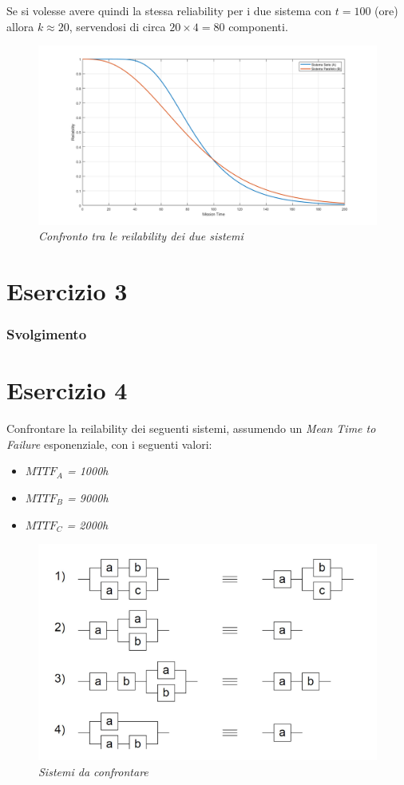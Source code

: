 Se si volesse avere quindi la stessa reliability per i due sistema con $t=100$ (ore) allora $k\approx20$, servendosi di circa $20\times 4 = 80$ componenti.
\begin{figure}[H]
	\centering
	\includegraphics[width=\textwidth]{img/hw5/es2_grafico3.png}
	\caption{\textit{Confronto tra le reilability dei due sistemi}}
\end{figure}

\section{Esercizio 3}
\subsubsection{Svolgimento}
\section{Esercizio 4}
Confrontare la reilability dei seguenti sistemi, assumendo un \textit{Mean Time to Failure} esponenziale, con i seguenti valori:
\begin{itemize}
	\item \textit{$MTTF_A$ = 1000h}
	\item \textit{$MTTF_B$ = 9000h}
	\item \textit{$MTTF_C$ = 2000h}
\end{itemize}
\begin{figure}[H]
	\centering
	\includegraphics[width=\textwidth]{img/hw5/es4_traccia.png}
	\caption{\textit{Sistemi da confrontare}}
\end{figure}
